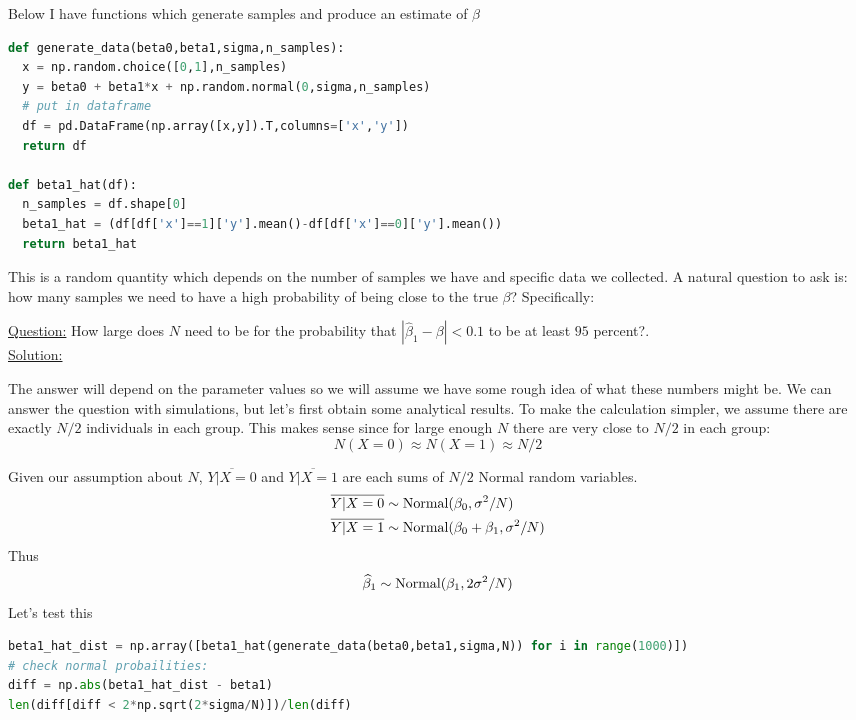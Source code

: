 \begin{example}
Below I have functions which generate samples and produce an estimate of $\beta$


\begin{lstlisting}[language=Python]
def generate_data(beta0,beta1,sigma,n_samples):
  x = np.random.choice([0,1],n_samples)
  y = beta0 + beta1*x + np.random.normal(0,sigma,n_samples)
  # put in dataframe
  df = pd.DataFrame(np.array([x,y]).T,columns=['x','y'])
  return df

def beta1_hat(df):
  n_samples = df.shape[0]
  beta1_hat = (df[df['x']==1]['y'].mean()-df[df['x']==0]['y'].mean())
  return beta1_hat
\end{lstlisting}


This is a random quantity which depends on the number of samples we have and specific data we collected. A natural question to ask is: how many samples we need to have a high probability of being close to the true $\beta$? Specifically: 

\noindent
\underline{Question:} How large does $N$ need to be for the probability that $|\hat{\beta}_1 - \beta|<0.1$ to be at least $95$ percent?. \\


 \noindent
\underline{Solution:} 


The answer will depend on the parameter values so we will assume we have some rough idea of what these numbers might be. We can answer the question with simulations, but let's first obtain some analytical results. To make the calculation simpler, we assume there are exactly $N/2$ individuals in each group. This makes sense since for large enough $N$ there are very close to $N/2$ in each group:
\begin{equation}
N(X=0) \approx  N(X=1) \approx N/2
\end{equation}

Given our assumption about $N$, $\overline{Y|X=0}$ and $\overline{Y|X=1}$ are each sums of $N/2$ Normal random variables.
\begin{align}
\overline{Y|X=0} &\sim {\rm Normal}(\beta_0,\sigma^2/N)\\
\overline{Y|X=1} &\sim {\rm Normal}(\beta_0+\beta_1,\sigma^2/N)
\end{align}
Thus
\begin{equation}
\widehat{\beta}_1 \sim {\rm Normal}(\beta_1,2\sigma^2/N)
\end{equation}
Let's test this

\begin{lstlisting}[language=Python]
beta1_hat_dist = np.array([beta1_hat(generate_data(beta0,beta1,sigma,N)) for i in range(1000)])
# check normal probailities:
diff = np.abs(beta1_hat_dist - beta1)
len(diff[diff < 2*np.sqrt(2*sigma/N)])/len(diff)
\end{lstlisting}





\end{example}

